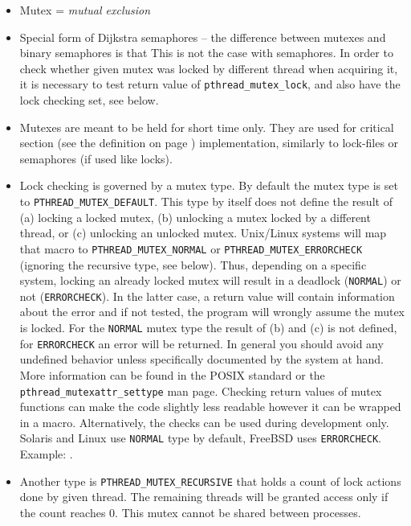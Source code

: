 \begin{itemize}
\item Mutex = \emph{mutual exclusion}
\item Special form of Dijkstra semaphores -- the difference between mutexes and
binary semaphores is that  This is not the case with
semaphores. In order to check whether given mutex was locked by different thread
when acquiring it, it is necessary to test return value of
\texttt{p\-thread\_mutex\_lock}, and also have the lock checking set, see below.
\item Mutexes are meant to be held for short time only. They are used for
critical section (see the definition on page \pageref{CRITICALSECTION})
implementation, similarly to lock-files or semaphores (if used like locks).
\item Lock checking is governed by a mutex type.  By default the mutex type is
set to \texttt{PTHREAD\_MUTEX\_DEF\-AULT}.  This type by itself does not define
the result of (a) locking a locked mutex, (b) unlocking a mutex locked by a
different thread, or (c) unlocking an unlocked mutex.  Unix/Linux systems will
map that macro to \texttt{PTHREAD\_MUTEX\_NORMAL} or
\texttt{PTHREAD\_\-MUT\-EX\_ERRORCHECK} (ignoring the recursive type, see
below).  Thus, depending on a specific system, locking an already locked mutex
will result in a deadlock (\texttt{NORMAL}) or not (\texttt{ERRORCHECK}).  In
the latter case, a return value will contain information about the error and if
not tested, the program will wrongly assume the mutex is locked.  For the
\texttt{NORMAL} mutex type the result of (b) and (c) is not
defined, for \texttt{ERRORCHECK} an error will be returned.
In general you should avoid any undefined behavior unless specifically
documented by the system at hand.  More information can be found in the POSIX
standard or the \texttt{pth\-read\_mutex\-attr\_set\-ty\-pe} man page.  Checking
return values of mutex functions can make the code slightly less readable
however it can be wrapped in a macro. Alternatively, the checks can be used
during development only.  Solaris and Linux use \texttt{NORMAL} type by default,
FreeBSD uses \texttt{ERRORCHECK}.  \label{NOTMYLOCK}
Example: .
\item Another type is \texttt{PTHREAD\_MUTEX\_RECURSIVE} that holds a count of
lock actions done by given thread. The remaining threads will be granted access
only if the count reaches 0. This mutex cannot be shared between processes.

\end{itemize}
